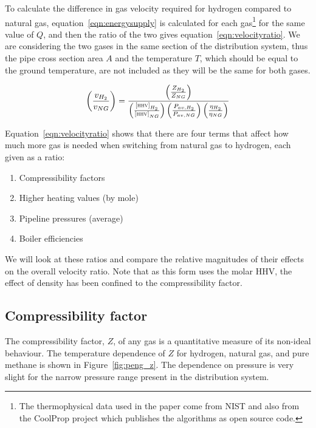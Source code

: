 \documentclass[5p]{elsarticle} %
\begin{document}
To calculate the difference in gas velocity required for hydrogen compared to natural gas,   equation~\eqref{eqn:energysupply} is  calculated
for each gas\footnote{
The thermophysical data used in the paper come from NIST\citep{Huber2022} and also from the CoolProp project\citep{coolprop} which publishes the algorithms as open source code.}
for the same value of $Q$, and then the ratio of the two gives equation~\eqref{eqn:velocityratio}. 
We are considering the two gases in the same section of the distribution system, thus the pipe cross section area $A$ and the temperature $T$, which should be equal to the ground temperature, are not included as they will be the same for both gases.

\begin{equation}
\label{eqn:velocityratio}
    \left(\frac{v_{H_2}}{v_{NG}}\right) = 
    \frac{
        \left(\frac{Z_{H_2}}{Z_{NG}}\right) 
    }{
        \left(\frac{\textsc{[\textsc{hhv}]}_{H_2}}{\textsc{[\textsc{hhv}]}_{NG}}\right)  
        \left(\frac{P_{av,H_2}}{P_{av,NG}}\right)
        \left(\frac{\eta_{H_2}}{\eta_{NG}}\right)
    }
\end{equation}

Equation~\eqref{eqn:velocityratio} shows that there are four terms that affect how much more gas is needed when switching from natural gas to hydrogen, each given as a ratio: 
\begin{enumerate}
    \item Compressibility factors
    \item Higher heating values (by mole)
    \item Pipeline pressures (average)
    \item Boiler efficiencies
\end{enumerate}
We will look at 
these ratios and compare the relative magnitudes of their effects on the overall velocity ratio.
Note that as this form uses the molar HHV, the effect of density has been confined to the compressibility factor.

\subsection{Compressibility factor}
\label{sec:compressibility}

The compressibility factor, $Z$, of any gas is a quantitative measure of its non-ideal behaviour. 
The temperature dependence of $Z$ for hydrogen, natural gas, and pure methane is shown in Figure~\ref{fig:peng_z}.
The dependence on pressure is very slight for the narrow pressure range present in the distribution system\citep{GS(M)2023, dodds2013}.
\end{document}
